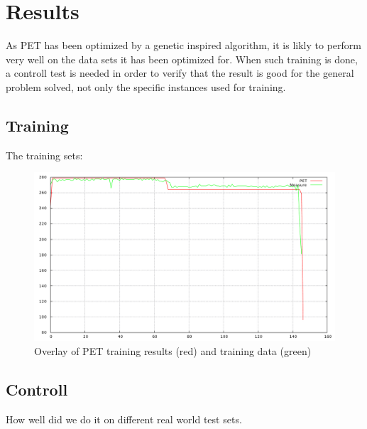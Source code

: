 \section{Results}

As PET has been optimized by a genetic inspired algorithm, it is likly to perform very well on the data sets it
has been optimized for. When such training is done, a controll test is needed in order to verify that the result
is good for the general problem solved, not only the specific instances used for training.

\subsection{Training}

The training sets:
\begin{figure}
\centering
\includegraphics[width=\textwidth]{figs/trend-training.pdf}
\caption{Overlay of PET training results (red) and training data (green)}
\label{fig:trend-training}
\end{figure}

\subsection{Controll}

How well did we do it on different real world test sets.
